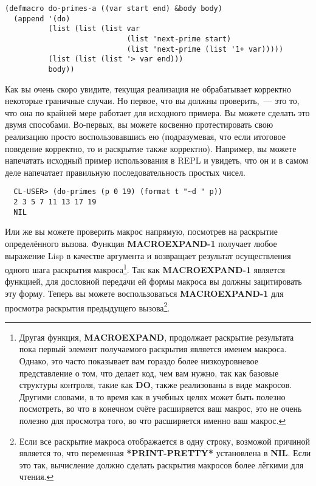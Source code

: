 \begin{lstlisting}
(defmacro do-primes-a ((var start end) &body body)
  (append '(do)
          (list (list (list var
                            (list 'next-prime start)
                            (list 'next-prime (list '1+ var)))))
          (list (list (list '> var end)))
          body))
\end{lstlisting}

Как вы очень скоро увидите, текущая реализация  не обрабатывает корректно
некоторые граничные случаи. Но первое, что вы должны проверить,~--- это то, что она по
крайней мере работает для исходного примера. Вы можете сделать это двумя
способами. Во-первых, вы можете косвенно протестировать свою реализацию просто
воспользовавшись ею (подразумевая, что если итоговое поведение корректно, то и раскрытие
также корректно). Например, вы можете напечатать исходный пример использования
 в REPL и увидеть, что он и в самом деле напечатает правильную
последовательность простых чисел.

\begin{verbatim}
  CL-USER> (do-primes (p 0 19) (format t "~d " p))
  2 3 5 7 11 13 17 19
  NIL
\end{verbatim}

Или же вы можете проверить макрос напрямую, посмотрев на раскрытие определённого
вызова. Функция \textbf{MACROEXPAND-1} получает любое выражение Lisp в качестве аргумента
и возвращает результат осуществления одного шага раскрытия макроса\footnote{Другая
  функция, \textbf{MACROEXPAND}, продолжает раскрытие результата пока первый элемент
  получаемого раскрытия является именем макроса. Однако, это часто показывает вам гораздо
  более низкоуровневое представление о том, что делает код, чем вам нужно, так как базовые
  структуры контроля, такие как \textbf{DO}, также реализованы в виде макросов. Другими
  словами, в то время как в учебных целях может быть полезно посмотреть, во что в конечном
  счёте расширяется ваш макрос, это не очень полезно для просмотра того, во что
  расширяется именно ваш макрос.}. Так как \textbf{MACROEXPAND-1} является функцией, для
дословной передачи ей формы макроса вы должны зацитировать эту форму. Теперь вы можете
воспользоваться \textbf{MACROEXPAND-1} для просмотра раскрытия предыдущего
вызова\footnote{Если все раскрытие макроса отображается в одну строку, возможой причиной
  является то, что переменная \textbf{ *PRINT-PRETTY* } установлена в \textbf{NIL}. Если
  это так, вычисление  должно сделать раскрытия макросов
  более лёгкими для чтения.}.

